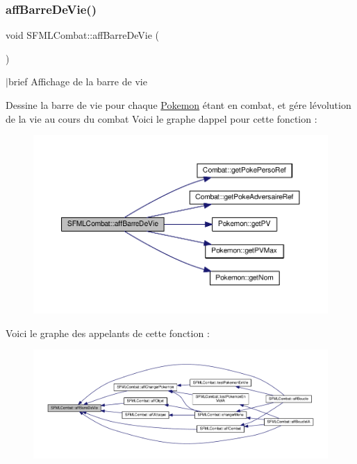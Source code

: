 \subsubsection{\texorpdfstring{aff\+Barre\+De\+Vie()}{affBarreDeVie()}}
{\footnotesize\ttfamily void S\+F\+M\+L\+Combat\+::aff\+Barre\+De\+Vie (\begin{DoxyParamCaption}{ }\end{DoxyParamCaption})\hspace{0.3cm}{\ttfamily [private]}}

$\vert$brief Affichage de la barre de vie

Dessine la barre de vie pour chaque \hyperlink{class_pokemon}{Pokemon} étant en combat, et gére l\textquotesingle{}évolution de la vie au cours du combat Voici le graphe d\textquotesingle{}appel pour cette fonction \+:\nopagebreak
\begin{figure}[H]
\begin{center}
\leavevmode
\includegraphics[width=350pt]{class_s_f_m_l_combat_ad5ab6d579c0da644135ae1e51e44f890_cgraph}
\end{center}
\end{figure}
Voici le graphe des appelants de cette fonction \+:\nopagebreak
\begin{figure}[H]
\begin{center}
\leavevmode
\includegraphics[width=350pt]{class_s_f_m_l_combat_ad5ab6d579c0da644135ae1e51e44f890_icgraph}
\end{center}
\end{figure}
\mbox{\label{class_s_f_m_l_combat_a39155235e6275b4d63b9317b9561843e}} 
